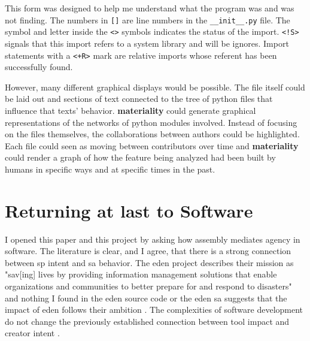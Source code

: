 \documentclass[a4paper,man,natbib,floatsintext]{apa6}
\begin{document}
  This form was designed to help me understand what the program was and was not finding. The numbers in \verb|[]| are line numbers in the \verb|__init__.py| file. The symbol and letter inside the \verb|<>| symbols indicates the status of the import. \verb|<!S>| signals that this import refers to a system library and will be ignores. Import statements with a \verb|<+R>| mark are relative imports whose referent has been successfully found\footnotemark. 


  However, many different graphical displays would be possible. The file itself could be laid out and sections of text connected to the tree of python files that influence that texts' behavior. \textbf{materiality} could generate graphical representations of the networks of \Gls{python} modules involved. Instead of focusing on the files themselves, the collaborations between authors could be highlighted. Each file could seen as moving between contributors over time and \textbf{materiality} could render a graph of how the feature being analyzed had been built by humans in specific ways and at specific times in the past.

  \section{Returning at last to Software}
  I opened this paper and this project by asking how assembly mediates agency in software. The literature is clear, and I agree, that there is a strong connection between \gls{sp} intent and \gls{sa} behavior. The \acrshort{eden} project describes their mission as "sav[ing] lives by providing information management solutions that enable organizations and communities to better prepare for and respond to disasters" and nothing I found in the \acrshort{eden} source code or the \acrshort{eden} \gls{sa} suggests that the impact of \acrshort{eden} follows their ambition \citep{Sahana_Foundation_undated-hl}. The complexities of software development do not change the previously established connection between tool impact and creator intent \citet{Subramaniam2014-wg}. 
\end{document}
